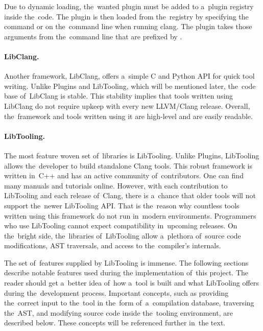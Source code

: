 Due to dynamic loading, the~wanted plugin must be added to a~plugin registry 
inside the~code.
The plugin is then loaded from the~registry by specifying the~ 
command or  on the~command line when running clang.
The plugin takes those arguments from the~command line that are prefixed 
by .

\paragraph{LibClang.}

Another framework, LibClang, offers a~simple C and Python API for quick 
tool writing. 
Unlike Plugins and LibTooling, which will be mentioned later, the~code 
base of~LibClang is stable. 
This stability implies that tools written using LibClang do not require
upkeep with every new LLVM/Clang release. 
Overall, the~framework and tools written using it are high-level and 
are easily readable.

\paragraph{LibTooling.}

The most feature woven set of~libraries is LibTooling. 
Unlike Plugins, LibTooling \citep{libtooling:online} 
allows the~developer to build standalone 
Clang tools. 
This robust framework is written in~C++ and has an active 
community of~contributors. 
One can find many manuals and tutorials online. 
However, with each contribution to LibTooling and each release of~Clang, 
there is a~chance that older tools will not support the~newer LibTooling 
API. 
That is the~reason why countless tools written using this framework do not
run in~modern environments. 
Programmers who use LibTooling cannot expect compatibility in~upcoming 
releases. 
On the~bright side, the~libraries of~LibTooling allow a~plethora of~source
code modifications, AST traversals, and access to the~compiler's internals.

The set of~features supplied by LibTooling is immense. 
The following sections describe notable features used during 
the implementation of~this project. 
The reader should get a~better idea of~how a~tool is built and what 
LibTooling offers during the~development process. 
Important concepts, such as providing the~correct input to the~tool 
in the~form of~a~compilation database, traversing the~AST, 
and modifying source code inside the~tooling environment, 
are described below. 
These concepts will be referenced further in~the text.

